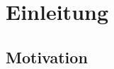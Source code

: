 \documentclass[11pt,english,ngerman, headsepline]{scrreprt}
\begin{document}
 




%
\tableofcontents{}

\pagestyle{scrheadings}    %



\chapter{Einleitung} 



\section{Motivation}
\end{document}
